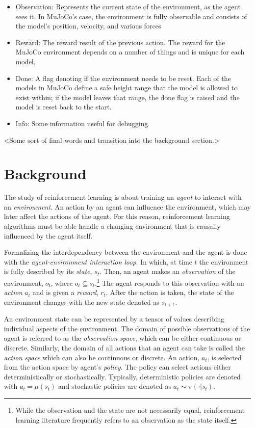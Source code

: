 \documentclass[conference]{IEEEtran}
\begin{document}
\begin{itemize}
    \item Observation: Represents the current state of the environment, as the agent sees it. In MuJoCo's case, the
          environment is fully observable and consists of the model's position, velocity, and various forces \cite{gym_source}
    \item Reward: The reward result of the previous action. The reward for the MuJoCo environment depends on a
          number of things and is unique for each model.
    \item Done: A flag denoting if the environment needs to be reset. Each of the models in MuJoCo define a safe height
          range that the model is allowed to exist within; if the model leaves that range, the done flag is raised and the
          model is reset back to the start.
    \item Info: Some information useful for debugging.
\end{itemize}



<Some sort of final words and transition into the background section.>

\section{Background}

The study of reinforcement learning is about training an \textit{agent} to interact with an \textit{environment}. An action by an agent can influence the environment, which may later affect the actions of the agent. For this reason, reinforcement learning algorithms must be able handle a changing environment that is causally influenced by the agent itself.

Formalizing the interdependency between the environment and the agent is done with the \textit{agent-environment interaction loop}. In which, at time $t$ the environment is fully described by its \textit{state}, $s_t$. Then, an agent makes an \textit{observation} of the environment, $o_t$, where $o_t \subseteq s_t$.\footnote{While the observation and the state are not necessarily equal, reinforcement learning literature frequently refers to an observation as the state itself.} The agent responds to this observation with an \textit{action} $a_t$ and is given a \textit{reward}, $r_t$. After the action is taken, the state of the environment changes with the new state denoted as $s_{t+1}$.

An environment state can be represented by a tensor of values describing individual aspects of the environment. The domain of possible observations of the agent is referred to as the \textit{observation space}, which can be either continuous or discrete. Similarly, the domain of all actions that an agent can take is called the \textit{action space} which can also be continuous or discrete. An action, $a_t$, is selected from the action space by agent's \textit{policy}. The policy can select actions either deterministically or stochastically. Typically, deterministic policies are denoted with $a_t = \mu(s_t)$ and stochastic policies are denoted as $a_t \sim \pi(\cdot | s_t)$. \cite{spinning_up_intro}
\end{document}
